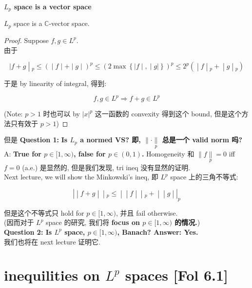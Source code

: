 \documentclass{qlnotes-export}
\begin{document}
\begin{lemma}{\protect{}\label{kn-l-p-space-is-a-vector-space}{\textbf{\(L_{p}\)
space is a vector space}}}

\(L_{p}\) space is a \(\mathbb{C}\)-vector space.

\end{lemma}

\begin{proof}

Suppose \(f,g \in L^{p}\).\\
由于

\[\left. |f + g \middle| {}_{p} \leq ( \middle| f \middle| + \middle| g \middle| )^{p} \leq (2\max\left\{ |f \middle| , \middle| g| \right\})^{p} \leq 2^{p}( \middle| f \middle| {}_{p} + \middle| g \middle| {}_{p}) \right.\]

于是 by linearity of integral, 得到:

\[f,g \in L^{p}\Longrightarrow f + g \in L^{p}\]

(Note: \(p > 1\) 时也可以 by \(|x|^{p}\) 这一函数的 convexity 得到这个 bound, 但是这个方法只有效于 \(p > 1\))

\end{proof}

但是 \textbf{Question 1:} \textbf{Is \(L_{p}\) a normed VS? 即, \(\parallel \cdot \underset{p}{\parallel}\) 总是一个 valid norm 吗?} A: \textbf{True for \(p \in \lbrack 1,\infty)\), false for \(p \in (0,1)\).} Homogeneity 和 \(\parallel f\underset{p}{\parallel} = 0\) iff \(f = 0\) (a.e.) 是显然的, 但是我们发现, tri ineq 没有显然的证明.\\
Next lecture, we will show the Minkowski's ineq, 即 \(L^{p}\) space 上的三角不等式:

\[\left. | \middle| f + g \middle| \middle| {}_{p} \leq \middle| \middle| f \middle| \middle| {}_{p} + \middle| \middle| g \middle| |_{p} \right.\]

但是这个不等式只 hold for \(p \in \lbrack 1,\infty)\), 并且 fail otherwise.\\
(因而对于 \(L^{p}\) space 的研究, 我们将 \textbf{focus on \(p \in \lbrack 1,\infty)\) 的情况.})\\
\textbf{Question 2: Is \(L^{p}\) space, \(p \in \lbrack 1,\infty)\), Banach? Answer: Yes.}\\
我们也将在 next lecture 证明它.

\section{\texorpdfstring{inequilities on \(L^{p}\) spaces {[}Fol 6.1{]}}{inequilities on L\^{}\{p\} spaces {[}Fol 6.1{]}}}
\end{document}
